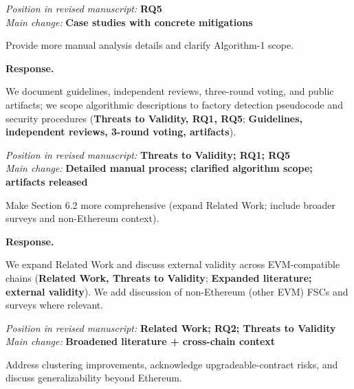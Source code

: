 \documentclass[acmsmall]{acmart}
\begin{document}
	\vspace{0.25em}
	\noindent
	\textit{Position in revised manuscript:} {\color{red}\textbf{RQ5}}\\ \textit{Main change:}
	{\color{blue}\textbf{Case studies with concrete mitigations}}

	\begin{tcolorbox}
		[commentbox,title=Editor/AE -- Comment 5] Provide more manual analysis details and clarify
		Algorithm-1 scope.
	\end{tcolorbox}

	\noindent
	\textbf{Response.}

	We document guidelines, independent reviews, three-round voting, and public artifacts; we scope
	algorithmic descriptions to factory detection pseudocode and security procedures ({\textbf{Threats to Validity, RQ1, RQ5}};
	{\textbf{Guidelines, independent reviews, 3-round voting, artifacts}}).

	\vspace{0.25em}
	\noindent
	\textit{Position in revised manuscript:} {\color{red}\textbf{Threats to Validity; RQ1; RQ5}}\\ \textit{Main
	change:}
	{\color{blue}\textbf{Detailed manual process; clarified algorithm scope; artifacts released}}

	\begin{tcolorbox}
		[commentbox,title=Editor/AE -- Comment 6] Make Section 6.2 more comprehensive (expand Related
		Work; include broader surveys and non-Ethereum context).
	\end{tcolorbox}

	\noindent
	\textbf{Response.}

	We expand Related Work and discuss external validity across EVM-compatible chains ({\textbf{Related Work, Threats to Validity}};
	{\textbf{Expanded literature; external validity}}). We add discussion of non-Ethereum (other EVM)
	FSCs and surveys where relevant.

	\vspace{0.25em}
	\noindent
	\textit{Position in revised manuscript:} {\color{red}\textbf{Related Work; RQ2; Threats to Validity}}\\
	\textit{Main change:} {\color{blue}\textbf{Broadened literature + cross-chain context}}

	\begin{tcolorbox}
		[commentbox,title=Editor/AE -- Comment 7] Address clustering improvements, acknowledge upgradeable-contract
		risks, and discuss generalizability beyond Ethereum.
	\end{tcolorbox}
\end{document}
